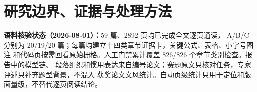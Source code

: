 \section{研究边界、证据与处理方法}

\noindent\textbf{语料核验状态（2026-08-01）：}59 篇、2892 页均已完成全文逐页通读，
A/B/C 分别为 20/19/20 篇；每篇均建立十四类章节证据卡，关键公式、表格、小字号图注
和代码页按需回看原始栅格。人工门禁累计覆盖 826/826 个章节类别检查。报告中的模型链、
段落组织和惯用表达来自编号论文；赛题原文只核对任务，专家评述只补充题型背景，不混入
获奖论文文风统计。自动页级统计只用于定位和版面量级，不替代逐页阅读结论。

